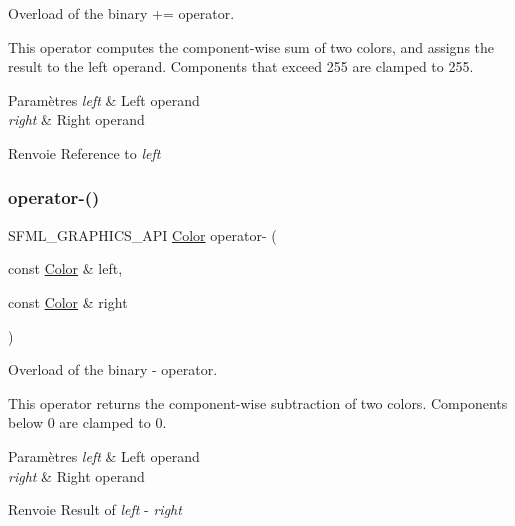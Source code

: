 Overload of the binary += operator. 

This operator computes the component-\/wise sum of two colors, and assigns the result to the left operand. Components that exceed 255 are clamped to 255.


\begin{DoxyParams}{Paramètres}
{\em left} & Left operand \\
\hline
{\em right} & Right operand\\
\hline
\end{DoxyParams}
\begin{DoxyReturn}{Renvoie}
Reference to {\itshape left} 
\end{DoxyReturn}
\mbox{\label{classsf_1_1Color_a6d9047ddbcec2bbab8519d93300bb2aa}} 
\subsubsection{\texorpdfstring{operator-\/()}{operator-()}}
{\footnotesize\ttfamily S\+F\+M\+L\+\_\+\+G\+R\+A\+P\+H\+I\+C\+S\+\_\+\+A\+PI \hyperlink{classsf_1_1Color}{Color} operator-\/ (\begin{DoxyParamCaption}\item[{const \hyperlink{classsf_1_1Color}{Color} \&}]{left,  }\item[{const \hyperlink{classsf_1_1Color}{Color} \&}]{right }\end{DoxyParamCaption})\hspace{0.3cm}{\ttfamily [related]}}



Overload of the binary -\/ operator. 

This operator returns the component-\/wise subtraction of two colors. Components below 0 are clamped to 0.


\begin{DoxyParams}{Paramètres}
{\em left} & Left operand \\
\hline
{\em right} & Right operand\\
\hline
\end{DoxyParams}
\begin{DoxyReturn}{Renvoie}
Result of {\itshape left} -\/ {\itshape right} 
\end{DoxyReturn}
\mbox{\label{classsf_1_1Color_a86ceee6b959136932020db4036918ecd}} 
